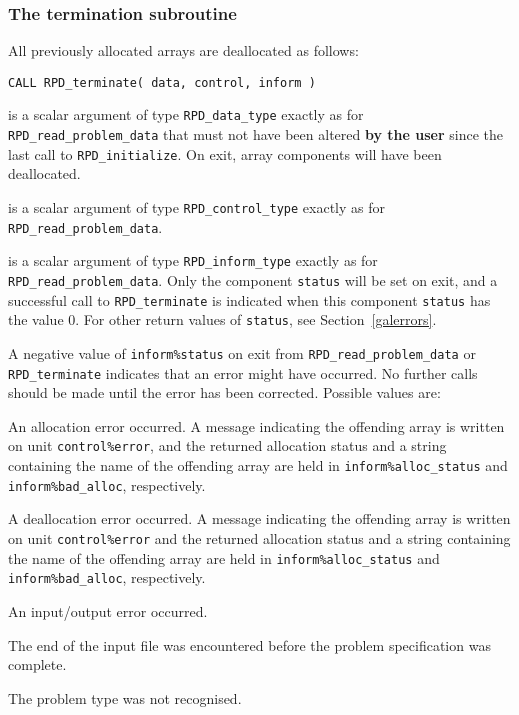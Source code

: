 \documentclass{galahad}
\newcommand{\packagename}{RPD}
\begin{document}

\subsubsection{The  termination subroutine}
All previously allocated arrays are deallocated as follows:

\hskip0.5in
{\tt CALL \packagename\_terminate( data, control, inform )}

\begin{description}

 is a scalar \intentinout argument of type
{\tt \packagename\_data\_type}
exactly as for
{\tt \packagename\_read\_problem\_data}
that must not have been altered {\bf by the user} since the last call to
{\tt \packagename\_initialize}.
On exit, array components will have been deallocated.

 is a scalar \intentin argument of type
{\tt \packagename\_control\_type}
exactly as for
{\tt \packagename\_read\_problem\_data}.

 is a scalar \intentout argument of type
{\tt \packagename\_inform\_type}
exactly as for
{\tt \packagename\_read\_problem\_data}.
Only the component {\tt status} will be set on exit, and a
successful call to
{\tt \packagename\_terminate}
is indicated when this  component {\tt status} has the value 0.
For other return values of {\tt status}, see Section~\ref{galerrors}.

\end{description}


\galerrors
A negative value of  {\tt inform\%status} on exit from
{\tt \packagename\_read\_problem\_data}
or
{\tt \packagename\_terminate}
indicates that an error might have occurred. No further calls should be made
until the error has been corrected. Possible values are:

\begin{description}
 An allocation error occurred. A message indicating
the offending
array is written on unit {\tt control\%error}, and the returned allocation
status and a string containing the name of the offending array
are held in {\tt inform\%alloc\_\-status}
and {\tt inform\%bad\_alloc}, respectively.

 A deallocation error occurred.
A message indicating the offending
array is written on unit {\tt control\%error} and the returned allocation
status and a string containing the name of the offending array
are held in {\tt inform\%alloc\_\-status}
and {\tt inform\%bad\_alloc}, respectively.

An input/output error occurred.

The end of the input file was encountered before the problem specification
was complete.

The problem type was not recognised.

\end{description}
\end{document}
